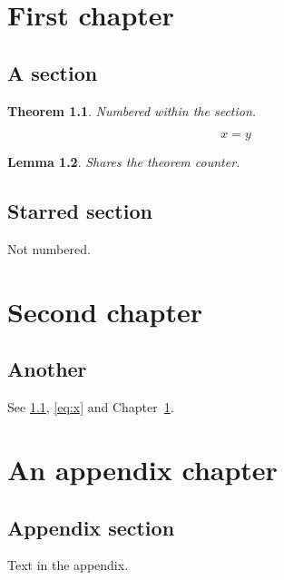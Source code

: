 \documentclass{report}
\numberwithin{equation}{section}
\newtheorem{theorem}{Theorem}[section]
\newtheorem{lemma}[theorem]{Lemma}
\begin{document}
\chapter{First chapter}\label{ch:one}
\section{A section}\label{sec:a}
\begin{theorem}\label{thm:x}
Numbered within the section.
\end{theorem}
\begin{equation}\label{eq:x}
  x = y
\end{equation}
\begin{lemma}
Shares the theorem counter.
\end{lemma}
\section*{Starred section}
Not numbered.
\chapter{Second chapter}
\section{Another}
See \cref{thm:x}, \eqref{eq:x} and Chapter~\ref{ch:one}.
\appendix
\chapter{An appendix chapter}
\section{Appendix section}
Text in the appendix.
\end{document}
